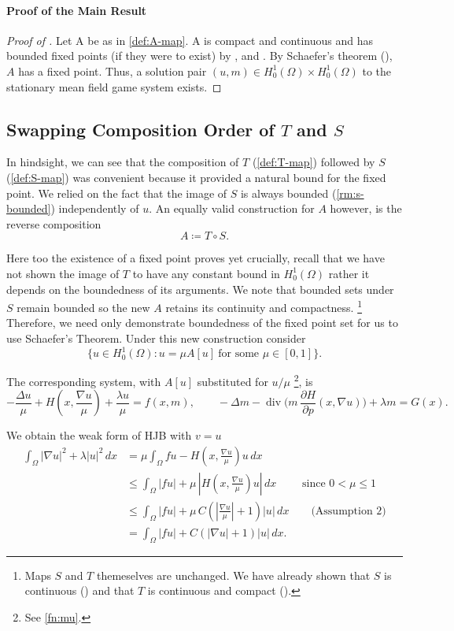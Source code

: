 \documentclass[11pt]{article}
\numberwithin{equation}{section}
\theoremstyle{definition}
\theoremstyle{remark}
\DeclareMathOperator{\diver}{div}
\newcommand{\Honez}{H_0^1(\Omega)}
\newcommand{\Hp}{\frac{\partial H}{\partial p}}
\begin{document}
\paragraph{Proof of the Main Result}
\begin{proof}[Proof of ]
Let A be as in \cref{def:A-map}. A is compact and continuous and has bounded fixed points (if they were to exist) by ,  and .
By Schaefer's theorem (), $A$ has a fixed point. Thus, a solution pair $(u,m) \in \Honez \times \Honez$ to the stationary mean field game system exists.
\end{proof}

\subsection{Swapping Composition Order of $T$ and $S$}
In hindsight, we can see that the composition of $T$ (\cref{def:T-map}) followed by $S$ (\cref{def:S-map}) was convenient because it provided a natural bound for the fixed point. We relied on the fact that
the image of $S$ is always bounded (\cref{rm:s-bounded}) independently of $u$.
An equally valid construction for $A$ however, is the reverse composition 
\[A \coloneqq T\circ S.\] 

Here too the existence of a fixed point proves  yet crucially, 
recall that we have not shown the image of $T$ to have any constant bound in $\Honez$ rather it depends on the boundedness of its arguments. 
We note that bounded sets under $S$ remain bounded so the new $A$ retains its continuity and compactness.
\footnote{Maps $S$ and $T$ themeselves are unchanged. We have already shown that $S$ is continuous () and that $T$ is continuous and compact ().} 
Therefore, we need only demonstrate boundedness of the fixed point set for us to use Schaefer's Theorem. 
Under this new construction consider
\[\{u\in\Honez: u=\mu A[u]\ \text{for some }\mu\in[0,1]\}.\]

The corresponding system, with $A[u]$ substituted for $u/ \mu$ \footnote{See \ref{fn:mu}.}, is
\[-\frac{\Delta u}{\mu} + H(x,\frac{\nabla u}{\mu}) + \frac{\lambda u}{\mu} = f(x,m), \qquad -\Delta m - \diver \bigl(m\,\Hp(x,\nabla u)\bigr) + \lambda m=G(x).\]

We obtain the weak form of HJB with $v = u$
  \begin{align*}
    \int_\Omega |\nabla u|^2 + \lambda |u|^2\,dx
    &= \mu\int_\Omega f u - H(x,\frac{\nabla u}{\mu})u\,dx\\
    &\le \int_\Omega |fu| + \mu\,|H(x,\frac{\nabla u}{\mu})u|\,dx \qquad \text{ since } 0 < \mu \le 1\\
    &\le \int_\Omega |fu| + \mu \,C(|\frac{\nabla u}{\mu}|+1)|u|\,dx \qquad \text{(Assumption 2)}\\
    &= \int_\Omega |fu| + C(|\nabla u|+1)|u|\,dx.
  \end{align*}
\end{document}

